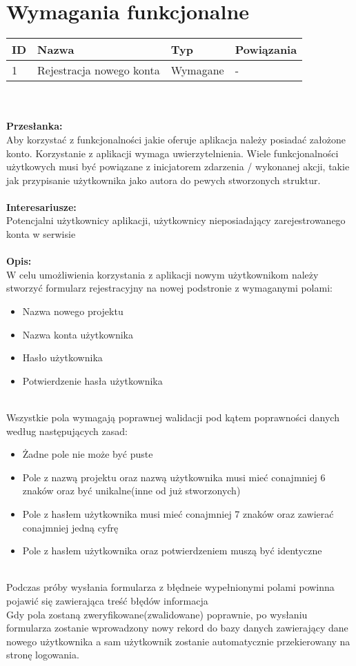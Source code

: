 \documentclass[eng,printmode]{mgr}
\begin{document}
\section{Wymagania funkcjonalne}
\begin{tabularx}{\textwidth}{ l | X | l | l }
\textbf {ID} & \textbf{Nazwa} & \textbf{Typ} & \textbf{Powiązania} \\
\hline
1 
& Rejestracja nowego konta
& Wymagane
& -
\end{tabularx}
\\ \\
\textbf{Przesłanka:} \\
Aby korzystać z funkcjonalności jakie oferuje aplikacja należy posiadać założone konto. Korzystanie z aplikacji wymaga uwierzytelnienia. Wiele funkcjonalności użytkowych musi być powiązane z inicjatorem zdarzenia / wykonanej akcji, takie jak przypisanie użytkownika jako autora do pewych stworzonych struktur.
\\ \\
\textbf{Interesariusze:} \\
Potencjalni użytkownicy aplikacji, użytkownicy nieposiadający zarejestrowanego konta w serwisie
\\ \\
\textbf{Opis:} \\
W celu umożliwienia korzystania z aplikacji nowym użytkownikom należy stworzyć formularz rejestracyjny na nowej podstronie z wymaganymi polami:
\begin{itemize}
	\item Nazwa nowego projektu
	\item Nazwa konta użytkownika
	\item Hasło użytkownika
	\item Potwierdzenie hasła użytkownika
\end{itemize}
\ \\
Wszystkie pola wymagają poprawnej walidacji pod kątem poprawności danych według następujących zasad:
\begin{itemize}
	\item Żadne pole nie może być puste
	\item Pole z nazwą projektu oraz nazwą użytkownika musi mieć conajmniej 6 znaków oraz być unikalne(inne od już stworzonych)
	\item Pole z hasłem użytkownika musi mieć conajmniej 7 znaków oraz zawierać conajmniej jedną cyfrę
	\item Pole z hasłem użytkownika oraz potwierdzeniem muszą być identyczne
\end{itemize}
\ \\
Podczas próby wysłania formularza z błędneie wypełnionymi polami powinna pojawić się zawierająca treść błędów informacja
\\
Gdy pola zostaną zweryfikowane(zwalidowane) poprawnie, po wysłaniu formularza zostanie wprowadzony nowy rekord do bazy danych zawierający dane nowego użytkownika a sam użytkownik zostanie automatycznie przekierowany na stronę logowania.
\end{document}
